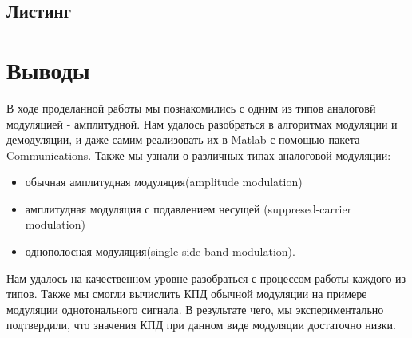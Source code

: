 \subsection{Листинг}

\parindent=1cm %



\section{Выводы}
В ходе проделанной работы мы познакомились с одним из типов аналоговй модуляцией - амплитудной.
Нам удалось разобраться в алгоритмах модуляции и демодуляции, и даже самим реализовать их в Matlab с помощью пакета Communications. Также мы узнали о различных типах аналоговой модуляции:
\begin{itemize}
	\item обычная амплитудная модуляция(amplitude modulation)
	\item амплитудная модуляция с подавлением несущей (suppresed-carrier modulation)
	\item однополосная модуляция(single side band modulation).
\end{itemize}
Нам удалось на качественном уровне разобраться с процессом работы каждого из типов.
Также мы смогли вычислить КПД обычной модуляции на примере модуляции однотонального сигнала.
В результате чего, мы экспериментально подтвердили, что значения КПД при данном виде модуляции достаточно низки. 


